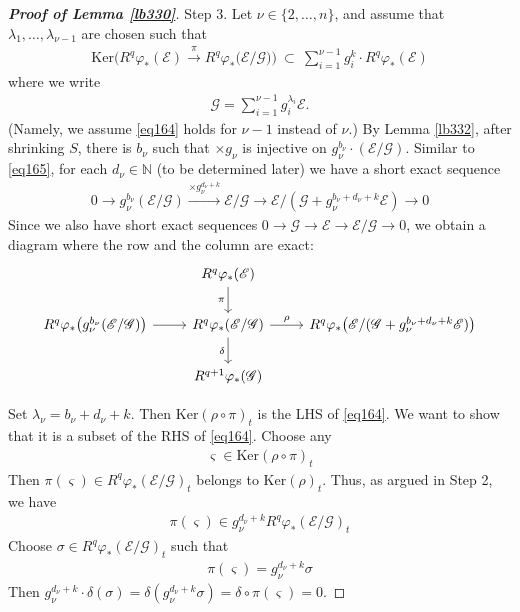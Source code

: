\documentclass[12pt,b5paper,notitlepage]{report}
\theoremstyle{definition}
\theoremstyle{plain}
\newcommand{\scr}{\mathscr}
\newcommand{\sgm}{\varsigma}
\newcommand{\Nbb}{\mathbb N}
\newcommand{\Ker}{\mathrm{Ker}}
\numberwithin{equation}{section}
\begin{document}
\begin{proof}[\textbf{Proof of Lemma \ref{lb330}}]
Step 3. Let $\nu\in\{2,\dots,n\}$, and assume that $\lambda_1,\dots,\lambda_{\nu-1}$ are chosen such that
\begin{align}
\Ker\Big(R^q\varphi_*(\scr E)\xrightarrow{\pi} R^q\varphi_*\big(\scr E/\scr G\big) \Big)~\subset~\sum_{i=1}^{\nu-1} g_i^k\cdot R^q\varphi_*(\scr E)  \label{eq166}
\end{align}
where we write
\begin{align*}
\scr G=\sum_{i=1}^{\nu-1}g_i^{\lambda_i}\scr E.
\end{align*}
(Namely, we assume \eqref{eq164} holds for $\nu-1$ instead of $\nu$.) By Lemma \ref{lb332}, after shrinking $S$, there is $b_\nu$ such that $\times g_\nu$ is injective on $g_\nu^{b_\nu}\cdot(\scr E/\scr G)$. Similar to \eqref{eq165}, for each $d_\nu\in\Nbb$ (to be determined later) we have a short exact sequence
\begin{align*}
0\rightarrow g_\nu^{b_\nu}(\scr E/\scr G)\xrightarrow{\times g_\nu^{d_\nu+k}}\scr E/\scr G\rightarrow \scr E/(\scr G+g_\nu^{b_\nu+d_\nu+k}\scr E)\rightarrow 0
\end{align*}
Since we also have short exact sequences $0\rightarrow\scr G\rightarrow\scr E\rightarrow\scr E/\scr G\rightarrow0$, we obtain a diagram where the row and the column are exact:
\begin{equation*}
\begin{tikzcd}
& R^q\varphi_*(\scr E)  \arrow[d, "\pi"'] &  \\
R^q\varphi_*\big( g_\nu^{b_\nu}(\scr E/\scr G)\big) \arrow[r] & R^q\varphi_*(\scr E/\scr G) \arrow[r,"\rho"] \arrow[d,"\delta"']          & R^q\varphi_*\big(\scr E/(\scr G+g_\nu^{b_\nu+d_\nu+k}\scr E)\big)                \\
            & R^{q+1}\varphi_*(\scr G)                             &                  
\end{tikzcd}
\end{equation*}

Set $\lambda_\nu=b_\nu+d_\nu+k$. Then $\Ker(\rho\circ\pi)_t$ is the LHS of \eqref{eq164}. We want to show that it is a subset of the RHS of \eqref{eq164}. Choose any
\begin{align*}
\sgm\in\Ker(\rho\circ\pi)_t
\end{align*}
Then $\pi(\sgm)\in R^q\varphi_*(\scr E/\scr G)_t$ belongs to $\Ker(\rho)_t$. Thus, as argued in Step 2, we have
\begin{align*}
\pi(\sgm)\in  g_\nu^{d_\nu+k}R^q\varphi_*(\scr E/\scr G)_t
\end{align*}
Choose $\sigma\in R^q\varphi_*(\scr E/\scr G)_t$ such that
\begin{align*}
\pi(\sgm)=g_\nu^{d_\nu+k}\sigma
\end{align*}
Then $g_\nu^{d_\nu+k}\cdot \delta(\sigma)=\delta(g_\nu^{d_\nu+k}\sigma)=\delta\circ\pi(\sgm)=0$.


\end{proof}
\end{document}
